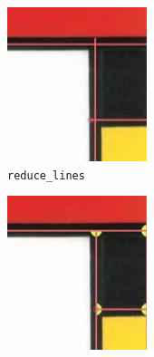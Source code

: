 \documentclass[serif,article,noparskip]{agse-thesis}
\begin{document}
\begin{figure}[b]
\begin{subfigure}{.23\textwidth}
  \includegraphics[width=\linewidth]{images/detect-2.jpg}
  \caption{\texttt{reduce\_lines}}
  \label{fig:detect2}
\end{subfigure}
\begin{subfigure}{.23\textwidth}
  \centering
  \includegraphics[width=\linewidth]{images/detect-3.jpg}

\end{subfigure}
\end{figure}
\end{document}
